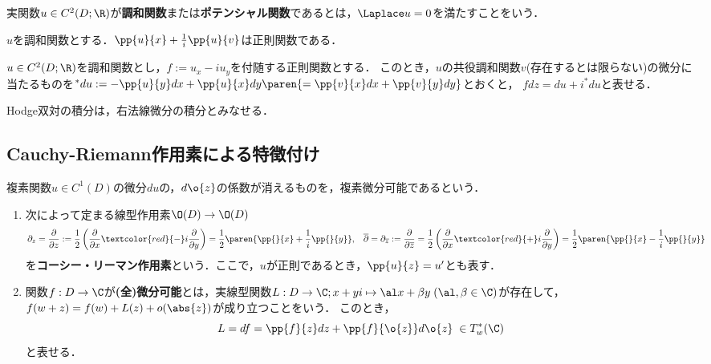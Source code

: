 \documentclass[uplatex, dvipdfmx]{jsreport}
\begin{document}
\begin{definition}
    実関数$u\in C^2(D;\R)$が\textbf{調和関数}または\textbf{ポテンシャル関数}であるとは，$\Laplace u=0$を満たすことをいう．
\end{definition}

\begin{proposition}[調和関数が定める正則関数]
    $u$を調和関数とする．$\pp{u}{x}+\frac{1}{i}\pp{u}{v}$は正則関数である．
\end{proposition}

\begin{proposition}
    $u\in C^2(D;\R)$を調和関数とし，$f:=u_x-iu_y$を付随する正則関数とする．
    このとき，$u$の共役調和関数$v$(存在するとは限らない)の微分に当たるものを${}^*du:=-\pp{u}{y}dx+\pp{u}{x}dy\paren{=\pp{v}{x}dx+\pp{v}{y}dy}$とおくと，
    $fdz=du+i{}^*du$と表せる．
\end{proposition}
\begin{remarks}
    Hodge双対の積分は，右法線微分の積分とみなせる．
\end{remarks}

\subsection{Cauchy-Riemann作用素による特徴付け}

\begin{tcolorbox}[colframe=ForestGreen, colback=ForestGreen!10!white,breakable,colbacktitle=ForestGreen!40!white,coltitle=black,fonttitle=\bfseries\sffamily,
title=]
    複素関数$u\in C^1(D)$の微分$du$の，$d\o{z}$の係数が消えるものを，複素微分可能であるという．
\end{tcolorbox}

\begin{definition}\mbox{}
    \begin{enumerate}
        \item 次によって定まる線型作用素$\O(D)\to\O(D)$
        \begin{align*}
            \partial_z&=\frac{\partial}{\partial z}:=\frac{1}{2}\left(\frac{\partial}{\partial x}\textcolor{red}{-}i\frac{\partial}{\partial y}\right)=\frac{1}{2}\paren{\pp{}{x}+\frac{1}{i}\pp{}{y}},&
            \overline{\partial}=\partial_{\overline{z}}&:=\frac{\partial}{\partial\overline{z}}=\frac{1}{2}\left(\frac{\partial}{\partial x}\textcolor{red}{+}i\frac{\partial}{\partial y}\right)=\frac{1}{2}\paren{\pp{}{x}-\frac{1}{i}\pp{}{y}}
        \end{align*}
        を\textbf{コーシー・リーマン作用素}という．ここで，$u$が正則であるとき，$\pp{u}{z}=u'$とも表す\cite{Hormander}．
        \item 関数$f:D\to\C$が\textbf{(全)微分可能}とは，実線型関数$L:D\to \C;x+yi\mapsto\al x+\beta y\;(\al,\beta\in\C)$が存在して，$f(w+z)=f(w)+L(z)+o(\abs{z})$が成り立つことをいう．
        このとき，
        \[L=df=\pp{f}{z}dz+\pp{f}{\o{z}}d\o{z}\;\in T^*_w(\C)\]
        と表せる．
    \end{enumerate}
\end{definition}
\end{document}
